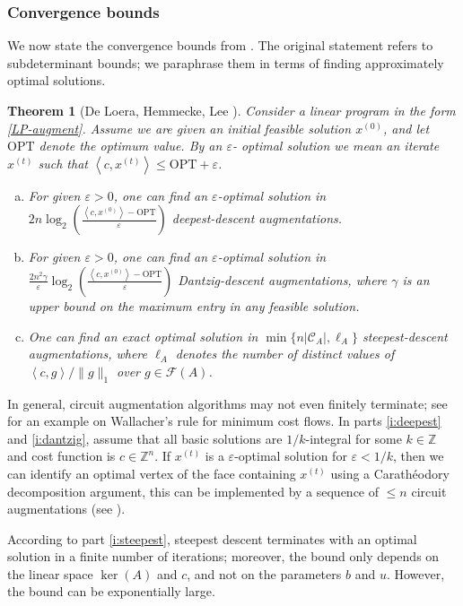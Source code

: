 \documentclass[11pt, a4paper]{article}
\newcommand{\circuits}{\mathcal{C}}
\newcommand{\pr}[2]{\left\langle #1, #2 \right\rangle}
\newcommand{\1}{\mathbbm{1}}
\newcommand{\OPT}{\mathrm{OPT}}
\newcommand{\EE}{\mathcal F}
\newtheorem{theorem}{Theorem}[section]
\theoremstyle{case}
\newcommand{\Z}{\mathbb{Z}}
\begin{document}
\subsubsection{Convergence bounds}
We now state the convergence bounds from \cite{DHL15}. The original statement refers to subdeterminant bounds; we paraphrase them in terms of finding approximately optimal solutions.

\begin{theorem}[{De Loera, Hemmecke, Lee \cite{DHL15}}]\label{thm:DLHL}
Consider a linear program in the form \ref{LP-augment}. 
Assume we are given an initial feasible solution $x^{(0)}$, and let $\OPT$ denote the optimum value. By an $\varepsilon$-
 optimal solution we mean an iterate $x^{(t)}$ such that $\pr{c}{x^{(t)}}\le \OPT+\varepsilon$.
\begin{enumerate}[(a)]
	\item \label{i:deepest}For given $\varepsilon>0$, one can find an $\varepsilon$-optimal solution in
	$2n\log_2\left(\frac{\pr{c}{x^{(0)}}-\OPT}{\varepsilon}\right)$ deepest-descent augmentations.
	\item\label{i:dantzig} For given $\varepsilon>0$, one can find an $\varepsilon$-optimal solution in
	$\frac{2n^2\gamma}{\varepsilon}\log_2\left(\frac{\pr{c}{x^{(0)}}-\OPT}{\varepsilon}\right)$  Dantzig-descent augmentations, where $\gamma$ is an upper bound on the maximum entry in any feasible solution.
	\item\label{i:steepest} One can find an exact optimal solution in $\min\{n|\circuits_A|,\ell_A\}$ steepest-descent augmentations, 
	 where $\ell_A$ denotes the number of distinct values of $\pr{c}{g}/\|g\|_1$ over $g\in \EE(A)$.
\end{enumerate}
\end{theorem}

In general, circuit augmentation algorithms may not even finitely terminate; see \cite{mccormick-shioura-not-strongly} for an example on Wallacher's rule for minimum cost flows.
In parts \ref{i:deepest} and \ref{i:dantzig}, assume that all basic solutions are $1/k$-integral for some $k\in \mathbb{Z}$ and cost function is $c\in \Z^n$. If $x^{(t)}$ is a $\varepsilon$-optimal solution for $\varepsilon<1/k$, then we can identify an optimal vertex of the face containing $x^{(t)}$ using 
a Carath\'eodory decomposition argument,
this can be implemented by a sequence of $\le n$ circuit augmentations (see \cite[Lemma 5]{DHL15}).

According to part \ref{i:steepest}, steepest descent terminates with  an optimal solution in a finite number of iterations; moreover,  the bound only depends on the linear space $\ker(A)$ and $c$, and not on the parameters $b$ and $u$. However, the bound can be exponentially large.
\end{document}
